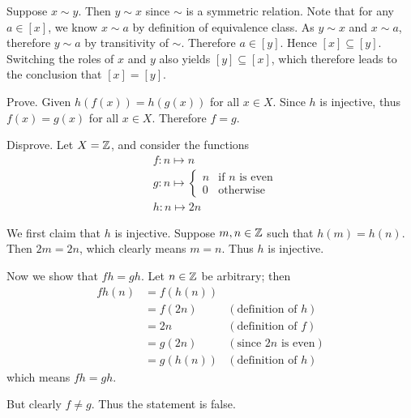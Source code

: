 \begin{questions}
\begin{partquestions}{\alph*}
        \item Suppose $x \mathrel{\sim} y$. Then $y \mathrel{\sim} x$ since $\sim$ is a symmetric relation. Note that for any $a \in [x]$, we know $x \mathrel{\sim} a$ by definition of equivalence class. As $y \mathrel{\sim} x$ and $x \mathrel{\sim} a$, therefore $y \mathrel{\sim} a$ by transitivity of $\sim$. Therefore $a \in [y]$. Hence $[x] \subseteq [y]$. Switching the roles of $x$ and $y$ also yields $[y] \subseteq [x]$, which therefore leads to the conclusion that $[x] = [y]$.
    \end{partquestions}

    \item \begin{partquestions}{\alph*}
        \item Prove. Given $h(f(x)) = h(g(x))$ for all $x \in X$. Since $h$ is injective, thus $f(x) = g(x)$ for all $x \in X$. Therefore $f = g$.

        \item Disprove. Let $X = \mathbb{Z}$, and consider the functions
        \begin{align*}
            &f: n \mapsto n\\
            &g: n \mapsto \begin{cases}
                n & \text{if } n \text{ is even}\\
                0 & \text{otherwise}
            \end{cases}\\
            &h: n \mapsto 2n
        \end{align*}

        We first claim that $h$ is injective. Suppose $m,n\in\mathbb{Z}$ such that $h(m) = h(n)$. Then $2m = 2n$, which clearly means $m = n$. Thus $h$ is injective.

        Now we show that $fh = gh$. Let $n \in \mathbb{Z}$ be arbitrary; then
        \begin{align*}
            fh(n) &= f(h(n))\\
            &= f(2n) & (\text{definition of } h)\\
            &= 2n & (\text{definition of } f)\\
            &= g(2n) & (\text{since } 2n \text{ is even})\\
            &= g(h(n)) & (\text{definition of } h)
        \end{align*}
        which means $fh = gh$.

        But clearly $f \neq g$. Thus the statement is false.
    \end{partquestions}


\end{questions}
